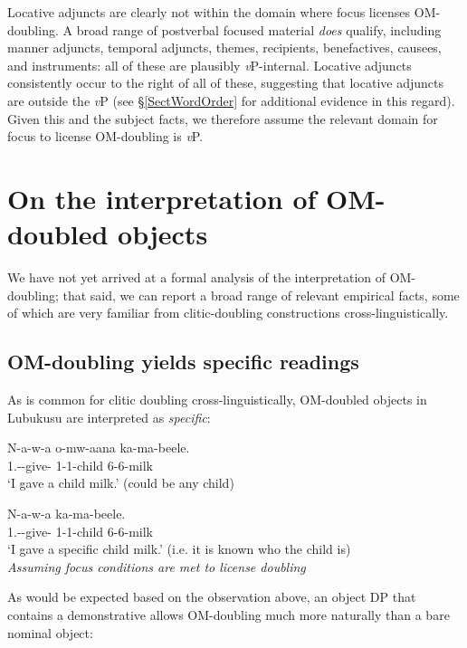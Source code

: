 \documentclass[output=paper]{langscibook}
\begin{document}
\noindent Locative adjuncts are clearly not within the domain where focus licenses OM-doubling. A broad range of postverbal focused material \textit{does} qualify, including manner adjuncts, temporal adjuncts, themes, recipients, benefactives, causees, and instruments: all of these are plausibly \textit{v}P-internal. Locative adjuncts consistently occur to the right of all of these, suggesting that locative adjuncts are outside the \textit{v}P (see \S \ref{SectWordOrder} for additional evidence in this regard). Given this and the subject facts, we therefore assume the relevant domain for focus to license OM-doubling is \textit{v}P.

\section{On the interpretation of OM-doubled objects} \label{SectInterpretationDoubling}

We have not yet arrived at a formal analysis of the interpretation of OM-doubling; that said, we can report a broad range of relevant empirical facts, some of which are very familiar from clitic-doubling constructions cross-linguistically.

\subsection{OM-doubling yields specific readings}

As is common for clitic doubling cross-linguistically, OM-doubled objects in Lubukusu are interpreted as \textit{specific}: 

\ea 
\begin{xlist}

\ex 
\gll N-a-w-a o-mw-aana ka-ma-beele. \\
1\Sg.\Sm-\Pst-give-\Fv{} 1-1-child 6-6-milk \\
\glt `I gave a child milk.' (could be any child) 

\ex 
\gll N-a-w-a  ka-ma-beele.  \\
1\Sg.\Sm-\Om-give-\Fv{} 1-1-child 6-6-milk \\
\glt `I gave a specific child milk.' (i.e. it is known who the child is) \\
\textit{Assuming focus conditions are met to license doubling}

\end{xlist}
\z 

\noindent As would be expected based on the observation above, an object DP that contains a demonstrative allows OM-doubling much more naturally than a bare nominal object: 
\end{document}
